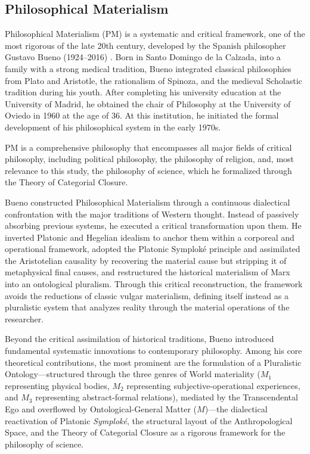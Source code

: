 \documentclass[11pt, a4paper]{article}
\begin{document}
\subsection{Philosophical Materialism} \label{sec:mf}
Philosophical Materialism (PM) is a systematic and critical framework, one of the most rigorous of the late 20th century,  developed by the Spanish philosopher Gustavo Bueno (1924–2016) \cite{fundacion_bueno_gustavo}.  Born in Santo Domingo de la Calzada, into a family with a strong medical tradition, Bueno integrated classical philosophies from Plato and Aristotle, the rationalism of Spinoza, and the medieval Scholastic tradition during his youth. After completing his university education at the University of Madrid, he obtained the chair of Philosophy at the University of Oviedo in 1960 at the age of 36. At this institution, he initiated the formal development of his philosophical system in the early 1970s.

PM is a comprehensive philosophy that encompasses all major fields of critical philosophy, including political philosophy, the philosophy of religion, and, most relevance to this study, the philosophy of science, which he formalized through the Theory of Categorial Closure.

Bueno constructed Philosophical Materialism through a continuous dialectical confrontation with the major traditions of Western thought. Instead of passively absorbing previous systems, he executed a critical transformation upon them. He inverted Platonic and Hegelian idealism to anchor them within a corporeal and operational framework, adopted the Platonic Symploké principle and assimilated the Aristotelian causality by recovering the material cause but stripping it of metaphysical final causes, and restructured the historical materialism of Marx into an ontological pluralism. Through this critical reconstruction, the framework avoids the reductions of classic vulgar materialism, defining itself instead as a pluralistic system that analyzes reality through the material operations of the researcher.

Beyond the critical assimilation of historical traditions, Bueno introduced fundamental systematic innovations to contemporary philosophy. Among his core theoretical contributions, the most prominent are the formulation of a Pluralistic Ontology---structured through the three genres of World materiality ($M_1$ representing physical bodies, $M_2$ representing subjective-operational experiences, and $M_3$ representing abstract-formal relations), mediated by the Transcendental Ego and overflowed by Ontological-General Matter ($M$)---the dialectical reactivation of Platonic \textit{Symploké}, the structural layout of the Anthropological Space, and the Theory of Categorial Closure as a rigorous framework for the philosophy of science.
\end{document}
